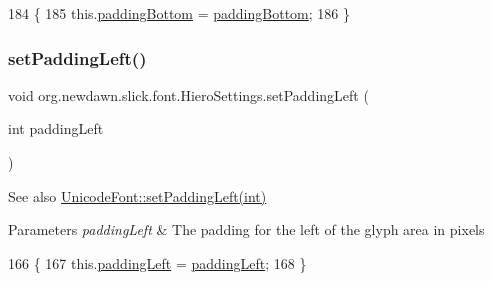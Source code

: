 \begin{DoxyCode}
184                                                     \{
185         this.\mbox{\hyperlink{classorg_1_1newdawn_1_1slick_1_1font_1_1_hiero_settings_a4ae9e95c341789431f72c0d7ad54b348}{paddingBottom}} = \mbox{\hyperlink{classorg_1_1newdawn_1_1slick_1_1font_1_1_hiero_settings_a4ae9e95c341789431f72c0d7ad54b348}{paddingBottom}};
186     \}
\end{DoxyCode}
\mbox{\label{classorg_1_1newdawn_1_1slick_1_1font_1_1_hiero_settings_a388dcb6c9e1dc31fa8ef7f8d504b3967}} 
\subsubsection{\texorpdfstring{set\+Padding\+Left()}{setPaddingLeft()}}
{\footnotesize\ttfamily void org.\+newdawn.\+slick.\+font.\+Hiero\+Settings.\+set\+Padding\+Left (\begin{DoxyParamCaption}\item[{int}]{padding\+Left }\end{DoxyParamCaption})\hspace{0.3cm}{\ttfamily [inline]}}

\begin{DoxySeeAlso}{See also}
\mbox{\hyperlink{classorg_1_1newdawn_1_1slick_1_1_unicode_font_a0ec91919e6999efd6ac061d3d8531c1e}{Unicode\+Font\+::set\+Padding\+Left(int)}}
\end{DoxySeeAlso}

\begin{DoxyParams}{Parameters}
{\em padding\+Left} & The padding for the left of the glyph area in pixels \\
\hline
\end{DoxyParams}

\begin{DoxyCode}
166                                                 \{
167         this.\mbox{\hyperlink{classorg_1_1newdawn_1_1slick_1_1font_1_1_hiero_settings_ae145770ffd7fbe5fb0bc1e54be252734}{paddingLeft}} = \mbox{\hyperlink{classorg_1_1newdawn_1_1slick_1_1font_1_1_hiero_settings_ae145770ffd7fbe5fb0bc1e54be252734}{paddingLeft}};
168     \}
\end{DoxyCode}
\mbox{\label{classorg_1_1newdawn_1_1slick_1_1font_1_1_hiero_settings_a2ecc3b11c381bbe15c7693f7757c9adf}} 
